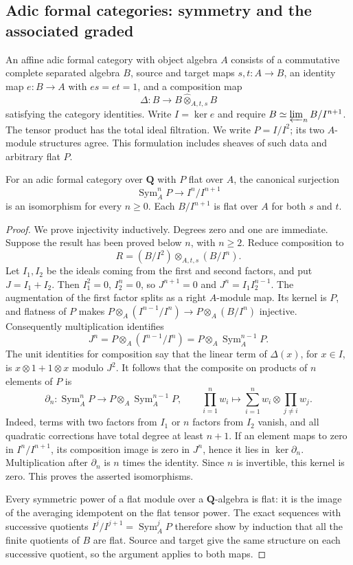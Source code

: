 \subsection{Adic formal categories: symmetry and the associated graded}
An affine adic formal category with object algebra $A$ consists of a
commutative complete separated algebra $B$, source and target maps
$s,t:A\to B$, an identity map $e:B\to A$ with $es=et=1$, and a
composition map
\[
 \Delta:B\longrightarrow B\widehat\otimes_{A,t,s} B
\]
satisfying the category identities.  Write $I=\ker e$ and require
$B\simeq\varprojlim_n B/I^{n+1}$.  The tensor product has the total
ideal filtration.  We write $P=I/I^2$; its two $A$-module structures
agree.  This formulation includes sheaves of such data and arbitrary
flat $P$.

\begin{lemma}\label{cat:L3}
For an adic formal category over $\mathbf Q$ with $P$ flat over $A$,
the canonical surjection
\[
 \operatorname{Sym}_A^nP\longrightarrow I^n/I^{n+1}
\]
is an isomorphism for every $n\geq0$.  Each $B/I^{n+1}$ is flat over
$A$ for both $s$ and $t$.
\end{lemma}
\begin{proof}
We prove injectivity inductively.  Degrees zero and one are immediate.
Suppose the result has been proved below $n$, with $n\geq2$.  Reduce
composition to
\[
 R=(B/I^2)\otimes_{A,t,s}(B/I^n).
\]
Let $I_1,I_2$ be the ideals coming from the first and second factors,
and put $J=I_1+I_2$.  Then $I_1^2=0$, $I_2^n=0$, so
$J^{n+1}=0$ and $J^n=I_1I_2^{n-1}$.
The augmentation of the first factor splits as a right $A$-module map.
Its kernel is $P$, and flatness of $P$ makes
$P\otimes_A(I^{n-1}/I^n)\to P\otimes_A(B/I^n)$ injective.
Consequently multiplication identifies
\[
 J^n=P\otimes_A(I^{n-1}/I^n)
     =P\otimes_A\operatorname{Sym}_A^{n-1}P.
\]
The unit identities for composition say that the linear term of
$\Delta(x)$, for $x\in I$, is $x\otimes1+1\otimes x$ modulo $J^2$.
It follows that the composite on products of $n$ elements of $P$ is
\[
 \partial_n:\operatorname{Sym}_A^nP\longrightarrow
       P\otimes_A\operatorname{Sym}_A^{n-1}P,
 \qquad
 \prod_{i=1}^n w_i\longmapsto
       \sum_{i=1}^n w_i\otimes\prod_{j\ne i}w_j.
\]
Indeed, terms with two factors from $I_1$ or $n$ factors from $I_2$
vanish, and all quadratic corrections have total degree at least $n+1$.
If an element maps to zero in $I^n/I^{n+1}$, its composition image is
zero in $J^n$, hence it lies in $\ker\partial_n$.
Multiplication after $\partial_n$ is $n$ times the identity.
Since $n$ is invertible, this kernel is zero.
This proves the asserted isomorphisms.

Every symmetric power of a flat module over a $\mathbf Q$-algebra is
flat: it is the image of the averaging idempotent on the flat tensor
power.  The exact sequences with successive quotients
$I^j/I^{j+1}=\operatorname{Sym}_A^jP$ therefore show by induction that
all the finite quotients of $B$ are flat.  Source and target give the
same structure on each successive quotient, so the argument applies
to both maps.
\end{proof}

